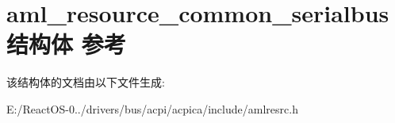 \hypertarget{structaml__resource__common__serialbus}{}\section{aml\+\_\+resource\+\_\+common\+\_\+serialbus结构体 参考}
\label{structaml__resource__common__serialbus}


该结构体的文档由以下文件生成\+:\begin{DoxyCompactItemize}
\item 
E\+:/\+React\+O\+S-\/0../drivers/bus/acpi/acpica/include/amlresrc.\+h\end{DoxyCompactItemize}
